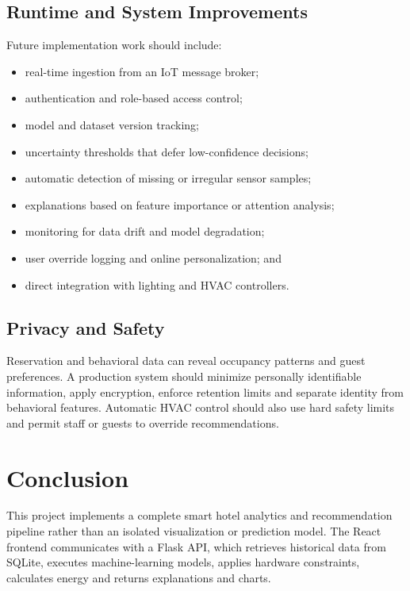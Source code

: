 \section{Runtime and System Improvements}

Future implementation work should include:

\begin{itemize}
    \item real-time ingestion from an IoT message broker;
    \item authentication and role-based access control;
    \item model and dataset version tracking;
    \item uncertainty thresholds that defer low-confidence decisions;
    \item automatic detection of missing or irregular sensor samples;
    \item explanations based on feature importance or attention analysis;
    \item monitoring for data drift and model degradation;
    \item user override logging and online personalization; and
    \item direct integration with lighting and HVAC controllers.
\end{itemize}

\section{Privacy and Safety}

Reservation and behavioral data can reveal occupancy patterns and guest
preferences. A production system should minimize personally identifiable
information, apply encryption, enforce retention limits and separate identity
from behavioral features. Automatic HVAC control should also use hard safety
limits and permit staff or guests to override recommendations.


\chapter{Conclusion}
\label{chap:conclusion}

This project implements a complete smart hotel analytics and recommendation
pipeline rather than an isolated visualization or prediction model. The React
frontend communicates with a Flask API, which retrieves historical data from
SQLite, executes machine-learning models, applies hardware constraints,
calculates energy and returns explanations and charts.

